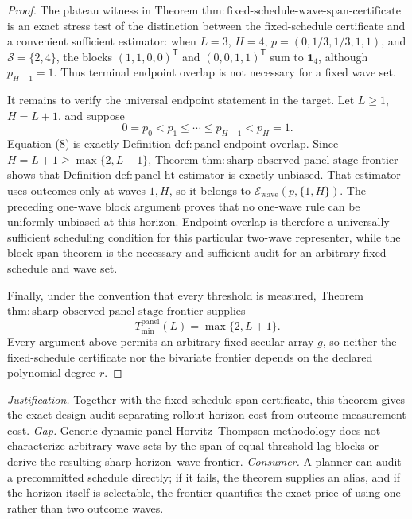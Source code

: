 \documentclass{article}
\begin{document}
\begin{proof}
The plateau witness in Theorem \(\mathrm{thm:fixed\text{-}schedule\text{-}wave\text{-}span\text{-}certificate}\) is an exact stress test of the distinction between the fixed-schedule certificate and a convenient sufficient estimator: when \(L=3\), \(H=4\), \(p=(0,1/3,1/3,1,1)\), and \(\mathcal S=\{2,4\}\), the blocks \((1,1,0,0)^{\mathsf T}\) and \((0,0,1,1)^{\mathsf T}\) sum to \(\mathbf 1_4\), although \(p_{H-1}=1\).  Thus terminal endpoint overlap is not necessary for a fixed wave set.

It remains to verify the universal endpoint statement in the target.  Let \(L\ge1\), \(H=L+1\), and suppose
\[
 0=p_0<p_1\le\cdots\le p_{H-1}<p_H=1.
\tag{8}
\]
Equation (8) is exactly Definition \(\mathrm{def:panel\text{-}endpoint\text{-}overlap}\).  Since \(H=L+1\ge\max\{2,L+1\}\), Theorem \(\mathrm{thm:sharp\text{-}observed\text{-}panel\text{-}stage\text{-}frontier}\) shows that Definition \(\mathrm{def:panel\text{-}ht\text{-}estimator}\) is exactly unbiased.  That estimator uses outcomes only at waves \(1,H\), so it belongs to \(\mathcal E_{\mathrm{wave}}(p,\{1,H\})\).  The preceding one-wave block argument proves that no one-wave rule can be uniformly unbiased at this horizon.  Endpoint overlap is therefore a universally sufficient scheduling condition for this particular two-wave representer, while the block-span theorem is the necessary-and-sufficient audit for an arbitrary fixed schedule and wave set.

Finally, under the convention that every threshold is measured, Theorem \(\mathrm{thm:sharp\text{-}observed\text{-}panel\text{-}stage\text{-}frontier}\) supplies
\[
 T_{\min}^{\mathrm{panel}}(L)=\max\{2,L+1\}.
\]
Every argument above permits an arbitrary fixed secular array \(g\), so neither the fixed-schedule certificate nor the bivariate frontier depends on the declared polynomial degree \(r\).
\end{proof}
\par\smallskip\noindent \textit{Justification.} Together with the fixed-schedule span certificate, this theorem gives the exact design audit separating rollout-horizon cost from outcome-measurement cost. \textit{Gap.} Generic dynamic-panel Horvitz--Thompson methodology does not characterize arbitrary wave sets by the span of equal-threshold lag blocks or derive the resulting sharp horizon--wave frontier. \textit{Consumer.} A planner can audit a precommitted schedule directly; if it fails, the theorem supplies an alias, and if the horizon itself is selectable, the frontier quantifies the exact price of using one rather than two outcome waves.
\end{document}
